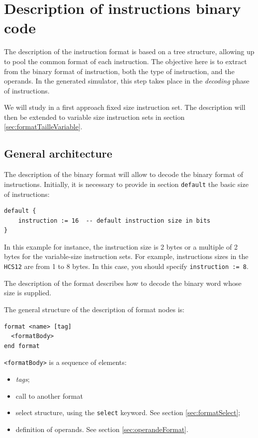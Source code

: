 \chapter{Description of instructions binary code}
\label{chap:format}
The description of the instruction format is based on a tree structure, allowing up to pool the common format of each instruction. The objective here is to extract from the binary format of instruction, both the type of instruction, and the operands. In the generated simulator, this step takes place in the \emph{decoding} phase of instructions.

We will study in a first approach fixed size instruction set. The description will then be extended to variable size instruction sets in section \ref{sec:formatTailleVariable}.

\section{General architecture}
The description of the binary format will allow to decode the binary format of instructions. Initially, it is necessary to provide in section \texttt{default} the basic size of instructions:
\begin{lstlisting}
default {
    instruction := 16  -- default instruction size in bits
}

\end{lstlisting}
In this example for instance, the instruction size is 2 bytes or a multiple of 2 bytes for the variable-size instruction sets. For example, instructions sizes in the \texttt{HCS12} are from 1 to 8 bytes. In this case, you should specify \texttt{instruction := 8}.

The description of the format describes how to decode the binary word whose size is supplied.

The general structure of the description of format nodes is:
\begin{lstlisting}
format <name> [tag]
  <formatBody>
end format
\end{lstlisting}

\texttt{<formatBody>} is a sequence of elements:
\begin{itemize}
\item \emph{tags};
\item call to another format
\item select structure, using the \texttt{select} keyword. See section \ref{sec:formatSelect};
\item definition of operands. See section \ref{sec:operandeFormat}.
\end{itemize}

